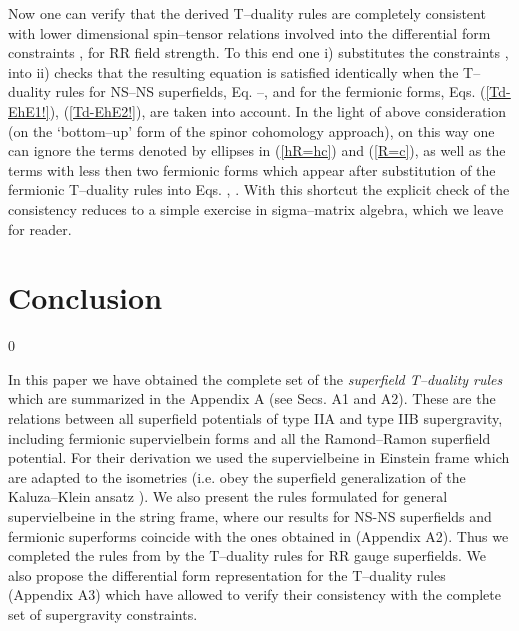 \documentclass[a4paper,11pt]{article}
\begin{document}
Now one can verify that the derived T--duality rules are completely 
consistent  with lower dimensional spin--tensor relations involved into the 
differential form constraints ,  for RR field strength. 
To this end one i) substitutes the constraints  
,  into 
 ii) checks that the resulting equation is satisfied  identically
when the T--duality rules for NS--NS superfields, Eq. 
--,  and for the 
fermionic forms, Eqs.  
(\ref{Td-EhE1!}), (\ref{Td-EhE2!}), 
are taken into account. 
In the light of above consideration (on the `bottom--up' form of 
the spinor cohomology approach), on this way one can 
ignore the terms denoted by ellipses in (\ref{hR=hc}) and (\ref{R=c}), 
as well as the terms with less then two fermionic forms which appear 
after substitution of the fermionic T--duality rules into Eqs.   
, . With this shortcut the explicit check of the consistency 
reduces to a simple exercise in sigma--matrix algebra, which we leave 
for reader. 








\section{Conclusion}
\setcounter{equation}0


In this paper we have obtained the complete set of the  
{\sl superfield T--duality rules} which are summarized in the Appendix A 
(see Secs. A1 and A2). 
These are  the relations between all 
superfield potentials of type IIA and type IIB supergravity,  
including fermionic supervielbein forms and 
all the  Ramond--Ramon superfield potential.
For their derivation we used the 
supervielbeine in Einstein frame which are 
adapted to the isometries 
(i.e. obey the superfield generalization of the Kaluza--Klein ansatz 
\cite{ansatz}). 
We also present the rules formulated for general  
supervielbeine in the string frame, 
where our results for NS-NS superfields and 
fermionic superforms coincide with the ones obtained 
in \cite{kulik} (Appendix A2). 
Thus we completed the rules from \cite{kulik} by 
the T--duality rules for RR gauge superfields. 
We also propose the differential form representation for 
the T--duality rules (Appendix A3)
which have allowed to verify their consistency 
with the complete set of supergravity constraints. 
\end{document}

